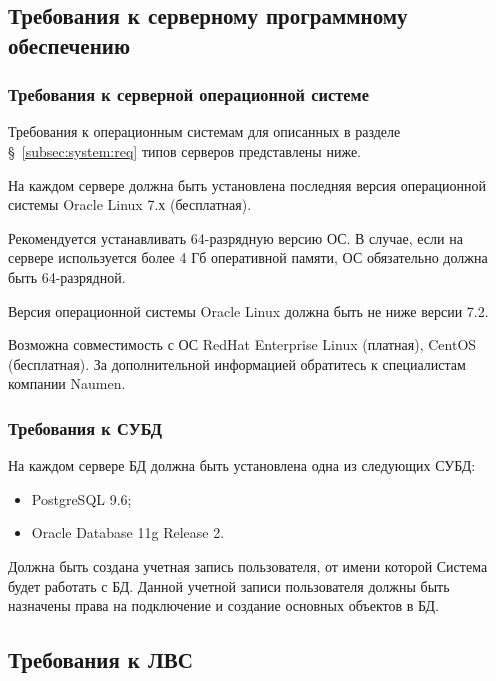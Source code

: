 \subsection{Требования к серверному программному обеспечению}

\subsubsection{Требования к серверной операционной системе}

Требования к операционным системам для описанных в разделе \S~\ref{subsec:system:req} типов серверов представлены ниже.

На каждом сервере должна быть установлена последняя версия операционной системы Oracle Linux 7.х (бесплатная).

Рекомендуется устанавливать 64-разрядную версию ОС.
В случае, если на сервере используется более 4 Гб оперативной памяти, ОС обязательно должна быть 64-разрядной.

Версия операционной системы Oracle Linux должна быть не ниже версии 7.2.

Возможна совместимость с ОС RedHat Enterprise Linux (платная), CentOS (бесплатная).
За дополнительной информацией обратитесь к специалистам компании Naumen.

\subsubsection{Требования к СУБД}

На каждом сервере БД должна быть установлена одна из следующих СУБД:
\begin{itemize}
    \item PostgreSQL 9.6;
    \item Oracle Database 11g Release 2. %
\end{itemize}

Должна быть создана учетная запись пользователя, от имени которой Система будет работать с БД.
Данной учетной записи пользователя должны быть назначены права на подключение и создание основных объектов в БД.

%
%
%
%
%
%


\subsection{Требования к ЛВС}


